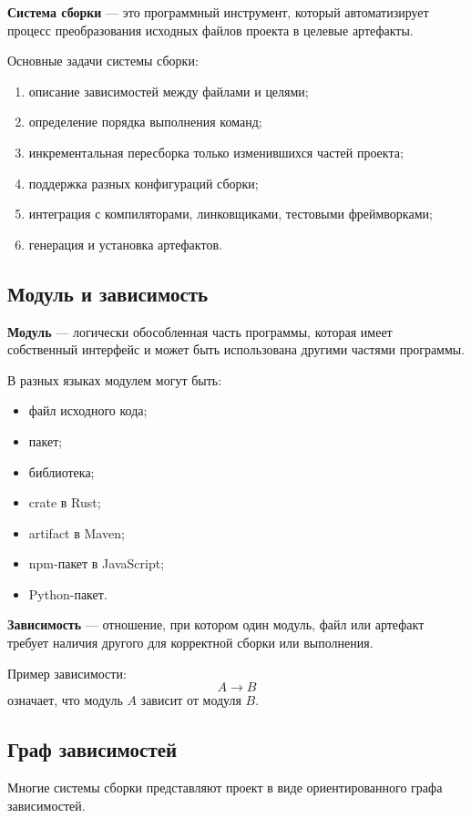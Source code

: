 \documentclass[12pt,a4paper]{article}
\begin{document}
\textbf{Система сборки} --- это программный инструмент, который автоматизирует процесс преобразования исходных файлов проекта в целевые артефакты.

Основные задачи системы сборки:
\begin{enumerate}
    \item описание зависимостей между файлами и целями;
    \item определение порядка выполнения команд;
    \item инкрементальная пересборка только изменившихся частей проекта;
    \item поддержка разных конфигураций сборки;
    \item интеграция с компиляторами, линковщиками, тестовыми фреймворками;
    \item генерация и установка артефактов.
\end{enumerate}

\subsection{Модуль и зависимость}

\textbf{Модуль} --- логически обособленная часть программы, которая имеет собственный интерфейс и может быть использована другими частями программы.

В разных языках модулем могут быть:
\begin{itemize}
    \item файл исходного кода;
    \item пакет;
    \item библиотека;
    \item crate в Rust;
    \item artifact в Maven;
    \item npm-пакет в JavaScript;
    \item Python-пакет.
\end{itemize}

\textbf{Зависимость} --- отношение, при котором один модуль, файл или артефакт требует наличия другого для корректной сборки или выполнения.

Пример зависимости:
\[
A \rightarrow B
\]
означает, что модуль $A$ зависит от модуля $B$.

\subsection{Граф зависимостей}

Многие системы сборки представляют проект в виде ориентированного графа зависимостей.
\end{document}
